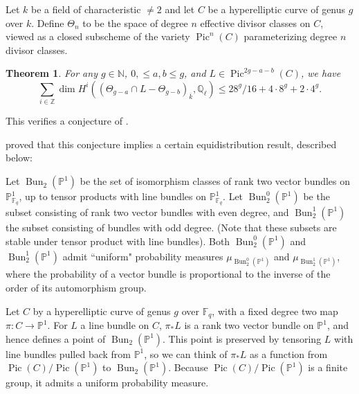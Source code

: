 \documentclass[12pt]{amsart}
\newtheorem{theorem}{Theorem}[section]
\theoremstyle{definition}
\theoremstyle{remark}
\begin{document}
Let $k$ be a field of characteristic $\neq 2$ and let $C$ be a hyperelliptic curve of genus $g$ over $k$. Define $\Theta_n$ to be the space of degree $n$ effective divisor classes on $C$, viewed as a closed subscheme of the variety $\operatorname{Pic}^n(C)$ parameterizing degree $n$ divisor classes.

\begin{theorem}\label{theta-betti-bound} For any $g \in \mathbb N$, $0,\leq a,b \leq g$, and $L \in \operatorname{Pic}^{2g-a-b} (C)$, we have \[ \sum_{i \in \mathbb Z} \dim  H^i (  (\Theta_{g-a} \cap L - \Theta_{g-b} )_{\overline{k}}, \mathbb Q_\ell) \leq 28^g/16 + 4\cdot 8^g + 2\cdot 4^g. \]  \end{theorem}

This verifies a conjecture of \citet[Conjecture 1.4]{TS}.

\citet[Theorem 4.4]{TS} proved that this conjecture implies a certain equidistribution result, described below:

Let $\operatorname{Bun}_2(\mathbb P^1)$ be the set of isomorphism classes of rank two vector bundles on $\mathbb P^1_{\mathbb F_q}$, up to tensor products with line bundles on $\mathbb P^1_{\mathbb F_q}$. Let $\operatorname{Bun}_2^0(\mathbb P^1)$ be the subset consisting of rank two vector bundles with even degree, and $\operatorname{Bun}_2^1(\mathbb P^1)$ the subset consisting of bundles with odd degree. (Note that these subsets are stable under tensor product with line bundles).  Both $\operatorname{Bun}_2^0(\mathbb P^1)$ and $\operatorname{Bun}_2^1 (\mathbb P^1)$ admit ``uniform" probability measures $\mu_{ \operatorname{Bun}_2^0(\mathbb P^1)} $ and $\mu_{\operatorname{Bun}_2^1 (\mathbb P^1)}$, where the probability of a vector bundle is proportional to the inverse of the order of its automorphism group.  

Let $C$ by a hyperelliptic curve of genus $g$ over $\mathbb F_q$, with a fixed degree two map $\pi: C \to \mathbb P^1$. For $L$ a line bundle on $C$, $\pi_* L$ is a rank two vector bundle on $\mathbb P^1$, and hence defines a point of $\operatorname{Bun}_2(\mathbb P^1)$. This point is preserved by tensoring $L$ with line bundles pulled back from $\mathbb P^1$, so we can think of $\pi_* L$ as a function from $\operatorname{Pic}(C)/ \operatorname{Pic}( \mathbb P^1) $ to $\operatorname{Bun}_2(\mathbb P^1)$. Because  $\operatorname{Pic}(C)/ \operatorname{Pic}( \mathbb P^1) $ is a finite group, it admits a uniform probability measure.
\end{document}
